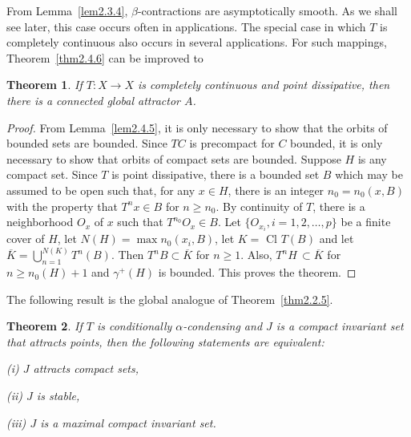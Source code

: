 \documentclass{surv-l}
\theoremstyle{plain}
\newtheorem{theorem}{Theorem}[section]
\theoremstyle{definition}
\numberwithin{equation}{section}
\numberwithin{figure}{chapter}
\begin{document}
From Lemma~\ref{lem2.3.4}, $\beta$-contractions are asymptotically smooth. As we shall see later, this case occurs often in applications. The special case in which $T$ is completely continuous also occurs in several applications. For such mappings, Theorem~\ref{thm2.4.6} can be improved to

\begin{theorem}\label{thm2.4.7} If $T\!:X\rightarrow X$ is completely continuous and point dissipative, then there is a connected global attractor $A$.
\end{theorem}

\begin{proof}
From Lemma~\ref{lem2.4.5}, it is only necessary to show that the orbits of bounded sets are bounded. Since $TC$ is precompact for $C$ bounded, it is only necessary to show that orbits of compact sets are bounded. Suppose $H$ is any compact set. Since $T$ is point dissipative, there is a bounded set $B$ which may be assumed to be open such that, for any $x\in H$, there is an integer $n_{0}=n_{0}(x, B)$ with the property that $T^{n}x\in B$ for $n\geq n_{0}$. By continuity of $T$, there is a neighborhood $O_{x}$ of $x$ such that $T^{n_{0}}O_{x}\in B$. Let $\{O_{x_{i}}, i=1,2, \ldots, p\}$ be a finite cover of $H$, let $N(H)= \max n_{0}(x_{i}, B)$, let $K=$ Cl $T(B)$ and let $\overline{K}= \bigcup_{n=1}^{N(K)}T^{n}(B)$. Then $T^{n}B\subset\overline{K}$ for $n\geq 1$. Also, $T^{n}H \,\subset \overline{K}$ for $n\geq n_{0}(H)+1$ and $\gamma^{+}(H)$ is bounded. This proves the theorem.
\end{proof}

The following result is the global analogue of Theorem~\ref{thm2.2.5}.

\begin{theorem}\label{thm2.4.8} If $T$ is conditionally $\alpha$-condensing and $J$ is a compact invariant set that attracts points, then the following statements are equivalent:

\emph{(i)} $J$ attracts compact sets,

\emph{(ii)} $J$ is stable,

\emph{(iii)} $J$ is a maximal compact invariant set.
\end{theorem}
\end{document}
